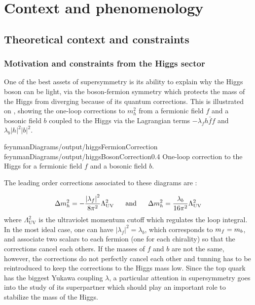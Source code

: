     \section{Context and phenomenology \label{sec:analysis_contextAndPheno}}

        \subsection{Theoretical context and constraints}

        \subsubsection{Motivation and constraints from the Higgs sector}

            One of the best assets of supersymmetry is its ability to explain why the Higgs
            boson can be light, via the boson-fermion symmetry which protects the mass
            of the Higgs from diverging because of its quantum corrections. This is illustrated on
            , showing the one-loop corrections to $m_h^2$
            from a fermionic field $f$ and a bosonic field $b$ coupled to the Higgs via the
            Lagrangian terms $- \lambda_f h \bar{f} f$ and $\lambda_b \left| h \right|^2 \left| b \right|^2$.

            {feynmanDiagrams/output/higgsFermionCorrection}
            {feynmanDiagrams/output/higgsBosonCorrection}{0.4}
            {One-loop correction to the Higgs for a fermionic field $f$ and a bosonic field $b$.}

            The leading order corrections associated to these diagrams are :

            \begin{equation}
                \Delta m_{h}^2 = - \frac{\left| \lambda_f \right|^2}{8\pi^2} \Lambda^2_{\text{UV}}
                \, \, \, \, \, \, \, \, \, \, \text{and} \, \, \, \, \, \, \, \, \, \,
                \Delta m_{h}^2 =   \frac{\lambda_b}{16\pi^2} \Lambda^2_{\text{UV}}
            \end{equation}
            where $\Lambda^2_{\text{UV}}$ is the ultraviolet momentum cutoff which regulates
            the loop integral. In the most ideal case, one can have $\left| \lambda_f \right|^2
            = \lambda_b$, which corresponds to $m_{f} = m_{b}$, and associate two scalars
            to each fermion (one for each chirality) so that the corrections cancel each others.
            If the masses of $f$ and $b$ are not the same, however, the corrections do not
            perfectly cancel each other and tunning has to be reintroduced to keep the
            corrections to the Higgs mass low. Since the top quark has the biggest Yukawa coupling $\lambda$, a
            particular attention in supersymmetry goes into the study of its superpartner
            which should play an important role to stabilize the mass of the Higgs.

